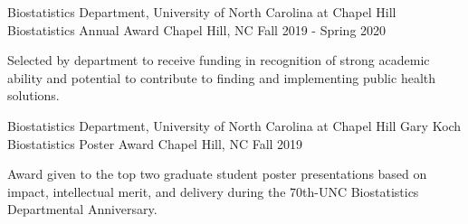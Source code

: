 


\begin{cventries}










\cventry
{Biostatistics Department, University of North Carolina at Chapel Hill} %
{Biostatistics Annual Award} %
{Chapel Hill, NC} %
{Fall 2019 - Spring 2020} %
{
\begin{cvitems} %
\item Selected by department to receive funding in recognition of strong academic ability and potential to contribute to finding \newline and implementing public health solutions.
  \end{cvitems}
}

\cventry
{Biostatistics Department, University of North Carolina at Chapel Hill} %
{Gary Koch Biostatistics Poster Award} %
{Chapel Hill, NC} %
{Fall 2019} %
{
\begin{cvitems} %
\item Award given to the top two graduate student poster presentations based on impact, intellectual merit, and \newline delivery during the 70th-UNC Biostatistics Departmental Anniversary.
  \end{cvitems}
}


\end{cventries}
